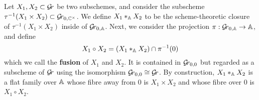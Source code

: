 \documentclass[draft]{article}
\begin{document}
Let $ X_1, X_2 \subset \Gr$ be two subschemes, and consider the subscheme $ \tau^{-1}(X_1 \times X_2) \subset \Gr_{0, \CC^\times} $.
% 
% 
We define $ X_1 \ast_{\AA} X_2 $ to be the scheme-theoretic closure of $  \tau^{-1}(X_1 \times X_2) $ inside of $ \Grbd $.  
Next, we consider the projection $ \pi: \Grbd \rightarrow \AA $, and define 
\begin{equation*}
    X_1 \circ X_2 = (X_1 \ast_\AA X_2) \cap \pi^{-1}(0) 
\end{equation*}
which we call the \textbf{fusion} of $ X_1 $ and $X_2$. It is contained in $\Gr_{0,0}$ but regarded as a subscheme of $ \Gr $ using {the isomorphism} $\Gr_{0,0} \cong \Gr $. 
% 
By construction, 
$X_1 \ast_{\AA} X_2 $ is a flat family over $\AA$ whose fibre away from $0$ is $X_1 \times X_2$ and whose fibre over $ 0$ is $ X_1 \circ X_2$.   


\end{document}
